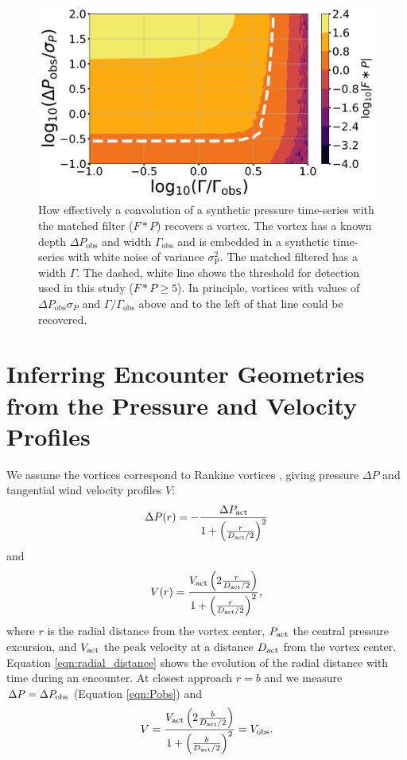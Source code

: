 \documentclass{aastex63}
\begin{document}
\begin{figure}
    \centering
    \includegraphics[width=\textwidth]{figures/vortex_recovery.png}
    \caption{How effectively a convolution of a synthetic pressure time-series with the matched filter ($F \ast P$) recovers a vortex. The vortex has a known depth $\Delta P_\text{obs}$ and width $\Gamma_\text{obs}$ and is embedded in a synthetic time-series with white noise of variance $\sigma_\text{P}^2$. The matched filtered has a width $\Gamma$. The dashed, white line shows the threshold for detection used in this study ($F \ast P \geq 5$). In principle, vortices with values of $\Delta P_\text{obs}\sigma_P$ and $\Gamma/\Gamma_\text{obs}$ above and to the left of that line could be recovered.}
    \label{fig:vortex_recovery}
\end{figure}

\section{Inferring Encounter Geometries from the Pressure and Velocity Profiles}
\label{sec:Inferring Encounter Geometries from the Pressure and Velocity Profiles}
We assume the vortices correspond to Rankine vortices \citep{1991ExFl...11...73V}, giving pressure $\Delta P$ and tangential wind velocity profiles $V$:
\begin{equation}
    \Delta P(r) = -\frac{\Delta P_{\rm act}}{1 + \left( \frac{r}{D_{\rm act}/2} \right)^2}\label{eqn:radial_lorentzian_profile}
\end{equation}
and
\begin{equation}
    V(r) = \frac{ V_{\rm act} \left( 2 \frac{r}{D_{\rm act}/2} \right)}{1 + \left( \frac{r}{D_{\rm act}/2} \right)^2},\label{eqn:radial_wind_profile}
\end{equation}
where $r$ is the radial distance from the vortex center, $P_{\rm act}$ the central pressure excursion, and $V_{\rm act}$ the peak velocity at a distance $D_{\rm act}$ from the vortex center. Equation \ref{eqn:radial_distance} shows the evolution of the radial distance with time during an encounter. At closest approach $r = b$ and we measure $\Delta P = \Delta P_{\rm obs}$ (Equation \ref{eqn:Pobs}) and 
\begin{equation}
    V = \frac{ V_{\rm act} \left( 2\frac{b}{D_{\rm act}/2} \right)}{1 + \left( \frac{b}{D_{\rm act}/2} \right)^2} = V_{\rm obs}.\label{eqn:Vobs}
\end{equation} 
\end{document}

